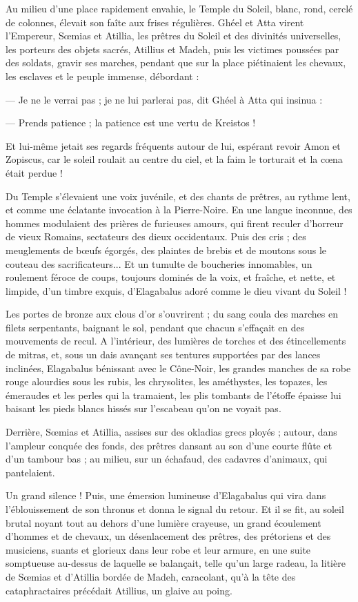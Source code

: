 \documentclass[a4paper, 11pt, oneside, polutonikogreek, french]{article}
\begin{document}
Au milieu d'une place rapidement envahie, le Temple du Soleil, blanc, rond, cerclé de colonnes, élevait son faîte aux frises régulières. Ghéel et Atta virent l'Empereur, Sœmias et Atillia, les prêtres du Soleil et des divinités universelles, les porteurs des objets sacrés, Atillius et Madeh, puis les victimes poussées par des soldats, gravir ses marches, pendant que sur la place piétinaient les chevaux, les esclaves et le peuple immense, débordant :

--- Je ne le verrai pas ; je ne lui parlerai pas, dit Ghéel à Atta qui insinua :

--- Prends patience ; la patience est une vertu de Kreistos !

Et lui-même jetait ses regards fréquents autour de lui, espérant revoir Amon et Zopiscus, car le soleil roulait au centre du ciel, et la faim le torturait et la cœna était perdue !

Du Temple s'élevaient une voix juvénile, et des chants de prêtres, au rythme lent, et comme une éclatante invocation à la Pierre-Noire. En une langue inconnue, des hommes modulaient des prières de furieuses amours, qui firent reculer d'horreur de vieux Romains, sectateurs des dieux occidentaux. Puis des cris ; des meuglements de bœufs égorgés, des plaintes de brebis et de moutons sous le couteau des sacrificateurs... Et un tumulte de boucheries innomables, un roulement féroce de coups, toujours dominés de la voix, et fraîche, et nette, et limpide, d'un timbre exquis, d'Elagabalus adoré comme le dieu vivant du Soleil !

Les portes de bronze aux clous d'or s'ouvrirent ; du sang coula des marches en filets serpentants, baignant le sol, pendant que chacun s'effaçait en des mouvements de recul. A l'intérieur, des lumières de torches et des étincellements de mitras, et, sous un dais avançant ses tentures supportées par des lances inclinées, Elagabalus bénissant avec le Cône-Noir, les grandes manches de sa robe rouge alourdies sous les rubis, les chrysolites, les améthystes, les topazes, les émeraudes et les perles qui la tramaient, les plis tombants de l'étoffe épaisse lui baisant les pieds blancs hissés sur l'escabeau qu'on ne voyait pas.

Derrière, Sœmias et Atillia, assises sur des okladias grecs ployés ; autour, dans l'ampleur conquée des fonds, des prêtres dansant au son d'une courte flûte et d'un tambour bas ; au milieu, sur un échafaud, des cadavres d'animaux, qui pantelaient.

Un grand silence ! Puis, une émersion lumineuse d'Elagabalus qui vira dans l'éblouissement de son thronus et donna le signal du retour. Et il se fit, au soleil brutal noyant tout au dehors d'une lumière crayeuse, un grand écoulement d'hommes et de chevaux, un désenlacement des prêtres, des prétoriens et des musiciens, suants et glorieux dans leur robe et leur armure, en une suite somptueuse au-dessus de laquelle se balançait, telle qu'un large radeau, la litière de Sœmias et d'Atillia bordée de Madeh, caracolant, qu'à la tête des cataphractaires précédait Atillius, un glaive au poing.
\end{document}
